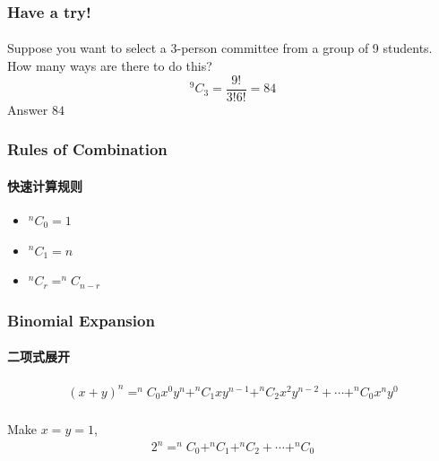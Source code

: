 \documentclass[
	11pt, %
]{beamer}
\begin{document}

\begin{frame}
	\frametitle{Have a try!}
	\framesubtitle{}
Suppose you want to select a 3-person committee from a
group of 9 students. How many ways are there to do this?
\pause
\begin{equation*}
	^9C_3 =\frac{9!}{3!6!} = 84
\end{equation*}
\bigskip
\pause
Answer \textbf{$84$} 
\end{frame}


\begin{frame}
	\frametitle{Rules of Combination}
	\framesubtitle{快速计算规则}
	\begin{itemize}
		\item $^nC_0=1$
		\item $^nC_1=n$ 
		\item $^nC_r = ^nC_{n-r}$ 
	\end{itemize}
\end{frame}



\begin{frame}
	\frametitle{Binomial Expansion}
	\framesubtitle{二项式展开}
	\begin{theorem}
			\begin{equation*}
			\begin{aligned}
				(x + y)^n = ^nC_0x^0 y^n + ^nC_1x y^{n-1} + ^nC_2x^2 y^{n-2} + \cdots + ^nC_0x^n y^{0}\\
			\end{aligned}		
			\end{equation*}		
	\end{theorem}
	\begin{corollary}
		Make $x=y =1$,
			\begin{equation*}
			\begin{aligned}
				2^n = ^nC_0+ ^nC_1 + ^nC_2 + \cdots + ^nC_0\\
			\end{aligned}		
			\end{equation*}		
	\end{corollary}
\end{frame}


\end{document}
